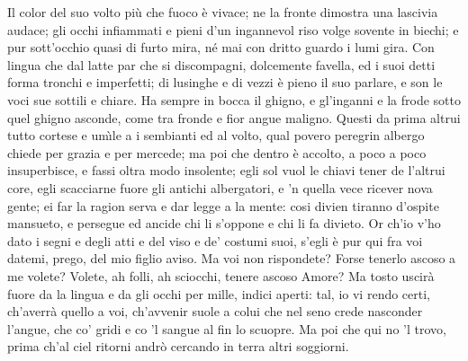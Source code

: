 \documentclass{book}
\begin{document}
	Il color del suo volto
	pi\`u che fuoco \`e vivace;
	ne la fronte dimostra
	una lascivia audace;
	gli occhi infiammati e pieni
	d'un ingannevol riso
	volge sovente in biechi; e pur sott'occhio
	quasi di furto mira,
	n\'e mai con dritto guardo i lumi gira.
	Con lingua che dal latte
	par che si discompagni,
	dolcemente favella, ed i suoi detti
	forma tronchi e imperfetti;
	di lusinghe e di vezzi
	\`e pieno il suo parlare,
	e son le voci sue sottili e chiare.
	Ha sempre in bocca il ghigno,
	e gl'inganni e la frode
	sotto quel ghigno asconde,
	come tra fronde e fior angue maligno.
	Questi da prima altrui
	tutto cortese e um\`{\i}le
	a i sembianti ed al volto,
	qual povero peregrin albergo chiede
	per grazia e per mercede;
	ma poi che dentro \`e accolto,
	a poco a poco insuperbisce, e fassi
	oltra modo insolente;
	egli sol vuol le chiavi
	tener de l'altrui core,
	egli scacciarne fuore
	gli antichi albergatori, e 'n quella vece
	ricever nova gente;
	ei far la ragion serva
	e dar legge a la mente:
	cosi divien tiranno
	d'ospite mansueto,
	e persegue ed ancide
	chi li s'oppone e chi li fa divieto.
	Or ch'io v'ho dato i segni
	e degli atti e del viso
	e de' costumi suoi,
	s'egli \`e pur qui fra voi
	datemi, prego, del mio figlio aviso.
	Ma voi non rispondete?
	Forse tenerlo ascoso a me volete?
	Volete, ah folli, ah sciocchi,
	tenere ascoso Amore?
	Ma tosto uscir\`a fuore
	da la lingua e da gli occhi
	per mille, indici aperti:
	tal, io vi rendo certi,
	ch'averr\`a quello a voi, ch'avvenir suole
	a colui che nel seno
	crede nasconder l'angue,
	che co' gridi e co 'l sangue al fin lo scuopre.
	Ma poi che qui no 'l trovo,
	prima ch'al ciel ritorni
   andr\`o cercando in terra altri soggiorni.

\endVersus
\endDrama
\end{document}
